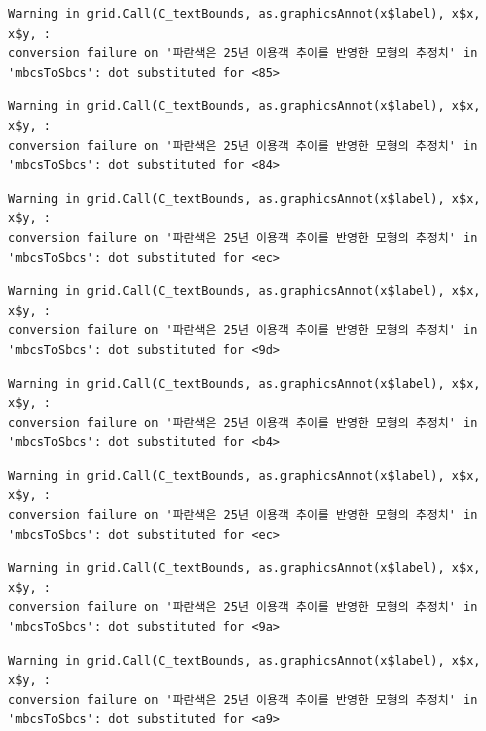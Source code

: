 \documentclass[
  letterpaper,
  DIV=11,
  numbers=noendperiod]{scrreprt}
\begin{document}
\begin{verbatim}
Warning in grid.Call(C_textBounds, as.graphicsAnnot(x$label), x$x, x$y, :
conversion failure on '파란색은 25년 이용객 추이를 반영한 모형의 추정치' in
'mbcsToSbcs': dot substituted for <85>
\end{verbatim}

\begin{verbatim}
Warning in grid.Call(C_textBounds, as.graphicsAnnot(x$label), x$x, x$y, :
conversion failure on '파란색은 25년 이용객 추이를 반영한 모형의 추정치' in
'mbcsToSbcs': dot substituted for <84>
\end{verbatim}

\begin{verbatim}
Warning in grid.Call(C_textBounds, as.graphicsAnnot(x$label), x$x, x$y, :
conversion failure on '파란색은 25년 이용객 추이를 반영한 모형의 추정치' in
'mbcsToSbcs': dot substituted for <ec>
\end{verbatim}

\begin{verbatim}
Warning in grid.Call(C_textBounds, as.graphicsAnnot(x$label), x$x, x$y, :
conversion failure on '파란색은 25년 이용객 추이를 반영한 모형의 추정치' in
'mbcsToSbcs': dot substituted for <9d>
\end{verbatim}

\begin{verbatim}
Warning in grid.Call(C_textBounds, as.graphicsAnnot(x$label), x$x, x$y, :
conversion failure on '파란색은 25년 이용객 추이를 반영한 모형의 추정치' in
'mbcsToSbcs': dot substituted for <b4>
\end{verbatim}

\begin{verbatim}
Warning in grid.Call(C_textBounds, as.graphicsAnnot(x$label), x$x, x$y, :
conversion failure on '파란색은 25년 이용객 추이를 반영한 모형의 추정치' in
'mbcsToSbcs': dot substituted for <ec>
\end{verbatim}

\begin{verbatim}
Warning in grid.Call(C_textBounds, as.graphicsAnnot(x$label), x$x, x$y, :
conversion failure on '파란색은 25년 이용객 추이를 반영한 모형의 추정치' in
'mbcsToSbcs': dot substituted for <9a>
\end{verbatim}

\begin{verbatim}
Warning in grid.Call(C_textBounds, as.graphicsAnnot(x$label), x$x, x$y, :
conversion failure on '파란색은 25년 이용객 추이를 반영한 모형의 추정치' in
'mbcsToSbcs': dot substituted for <a9>
\end{verbatim}
\end{document}
